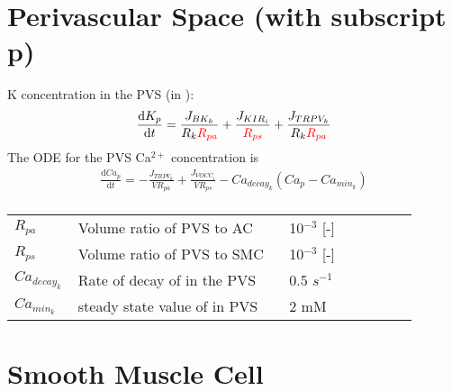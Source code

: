 \documentclass[fleqn]{report}
\numberwithin{equation}{section}
\numberwithin{equation}{section}
\newcommand{\Ca}{\text{Ca$^{2+}$}}
\begin{document}
	\section{Perivascular Space (with subscript p)}	
	\gls{K} concentration in the PVS  (in \uM):
	\begin{equation} \label{eq:K_p}
	\dfrac{\mathrm{d}K_{p}}{\mathrm{d}t}= \frac{J_{BK_k}}{R_k \textcolor{red}{R_{pa}}} + \frac{J_{KIR_i}}{ \textcolor{red}{R_{ps}}}+\frac{J_{TRPV_{k}}}{R_k \textcolor{red}{R_{pa}} }
	\end{equation}
	The ODE for the PVS Ca$^{2+}$ concentration is
	\begin{eqnarray}
	\frac{\mathrm{d}Ca_{p}}{\mathrm{d}t} = -\frac{J_{TRPV_{k}}}{VR_{pa}}+\frac{J_{VOCC_{i}}}{VR_{ps}}-Ca_{decay_{k}}(Ca_{p}-Ca_{min_k})\\
	\end{eqnarray}
	\begin{table}[h!]
	\centering
	\begin{tabular}{ p{0.09\linewidth}  >{\footnotesize} p{0.5\linewidth}  >{\footnotesize} p{0.27\linewidth} >{\footnotesize} p{0.03\linewidth} }
	\hline
	$ R_{pa} $  & Volume ratio of PVS to AC & 10$^{-3}$ [-] & \cite{Nagelhus1999} \\
	$ R_{ps} $  & Volume ratio of PVS to SMC & 10$^{-3}$ [-] & \cite{Nagelhus1999} \\
	$Ca_{decay_{k}}$ & Rate of decay of \Ca in the PVS   & 0.5  $s^{-1}$ & \\
	$Ca_{min_k}$ & steady state value of \Ca in PVS  & 2 mM  &  \\
	\hline
	\end{tabular}
	\end{table}
	
	\section{Smooth Muscle Cell}
\end{document}
